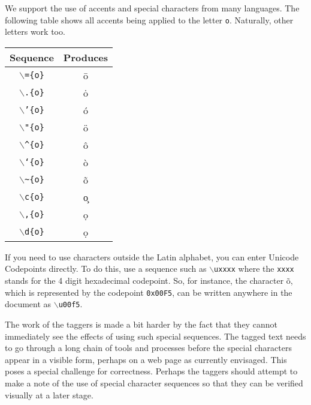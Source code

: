 \documentclass[11pt]{article}
\newcommand{\cmd}[1]{{\tt $\backslash$#1}}
\begin{document}
We support the use of accents and special characters from many
languages. The following table shows all accents being applied to the
letter {\tt o}. Naturally, other letters work too.


\vspace{0.4cm}
\begin{tabular}{c|c}
  Sequence & Produces\\
\hline
  \cmd{=\{o\}} & \=o \\
  \cmd{.\{o\}} & \.o \\
  \cmd{'\{o\}} & \'o \\
  \cmd{"\{o\}} & \"o \\
  \cmd{\textasciicircum \{o\}} & \^o \\
  \cmd{`\{o\}} & \`o \\
  \cmd{\textasciitilde \{o\}} & \~o \\
  \cmd{c\{o\}} & \c{o}\\
  \cmd{,\{o\}} & \d{o}\\
  \cmd{d\{o\}} & \d{o}\\
\end{tabular}
\vspace{0.4cm}

If you need to use characters outside the Latin alphabet, you can
enter Unicode Codepoints directly. To do this, use a sequence such as
\cmd{uxxxx} where the {\tt xxxx} stands for the 4 digit hexadecimal
codepoint. So, for instance, the character \~o, which is represented
by the codepoint {\tt 0x00F5}, can be written anywhere in the document
as \cmd{u00f5}.

The work of the taggers is made a bit harder by the fact that they
cannot immediately see the effects of using such special
sequences. The tagged text needs to go through a long chain of tools
and processes before the special characters appear in a visible form,
perhaps on a web page as currently envisaged. This poses a special
challenge for correctness.  Perhaps the taggers should attempt to make
a note of the use of special character sequences so that they can be
verified visually at a later stage.
\end{document}
